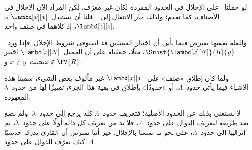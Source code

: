 \documentclass[../../../include/open-logic-section]{subfiles}
\begin{document}
لو حملنا~ على الإحلال في الحدود المفردة لكان غير معرّف.
لكن المراد الآن الإحلال في الأصناف، كما تقدم؛ ولذلك جاز الانتقال إلى~:
فلنا أن نستبدل~$\lambd[x][x]$ بـ$\lambd[z][z]$، إذ كلاهما في صنف واحد.

وللعلة نفسها نفترض فيما يأتي أن اختيار الممثلين قد استوفى شروط الإحلال.
فإذا ورد~$\Subst{\lambd[x][N]}{R}{y}$، مثلًا، حملناه على أن الممثل~$\lambd[x][N]$
اختير بحيث~$x \neq y$ و$x \notin \FV{R}$.

ولما كان إطلاق «صنف» على~$\lambd[x][x]$ غير مألوف بعض الشيء،
سمينا هذه الأشياء فيما يأتي حدود~$\Lambda$، أو «حدودًا» بإطلاق في بقية هذا الجزء،
تمييزًا لها من حدود~$\lambda$ المعهودة.

\begin{editorial}
  لا نستغني بذلك عن الحدود الأصلية؛ فتعريف حدود~$\Lambda$ كله يرجع إلى
  حدود~$\lambda$. ولم نضع بعد طريقة لتعريف الدوال على حدود~$\Lambda$،
  فلا بد من تعريف كل دالة أولًا على حدود~$\lambda$،
  ثم إنزالها إلى حدود~$\Lambda$، على نحو ما صنعنا بالإحلال.
  غير أننا نفترض أن القارئ يدرك حدسيًا كيف تعرّف الدوال على حدود~$\Lambda$.
\end{editorial}
\end{document}
